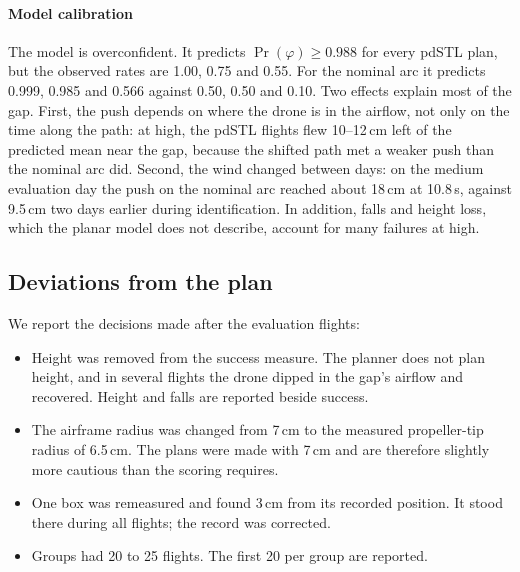 \paragraph{Model calibration}
The model is overconfident. It predicts $\Pr(\varphi) \ge 0.988$ for every
pdSTL plan, but the observed rates are 1.00, 0.75 and 0.55. For the
nominal arc it predicts 0.999, 0.985 and 0.566 against 0.50, 0.50 and
0.10. Two effects explain most of the gap. First, the push depends on
where the drone is in the airflow, not only on the time along the path:
at high, the pdSTL flights flew 10--12\,cm left of the predicted mean
near the gap, because the shifted path met a weaker push than the nominal
arc did. Second, the wind changed between days: on the medium evaluation
day the push on the nominal arc reached about 18\,cm at 10.8\,s, against
9.5\,cm two days earlier during identification. In addition, falls and
height loss, which the planar model does not describe, account for many
failures at high.

\subsection{Deviations from the plan}

We report the decisions made after the evaluation flights:
\begin{itemize}
  \item Height was removed from the success measure. The planner does not
    plan height, and in several flights the drone dipped in the gap's
    airflow and recovered. Height and falls are reported beside success.
  \item The airframe radius was changed from 7\,cm to the measured
    propeller-tip radius of 6.5\,cm. The plans were made with 7\,cm and
    are therefore slightly more cautious than the scoring requires.
  \item One box was remeasured and found 3\,cm from its recorded position.
    It stood there during all flights; the record was corrected.
  \item Groups had 20 to 25 flights. The first 20 per group are reported.
\end{itemize}
